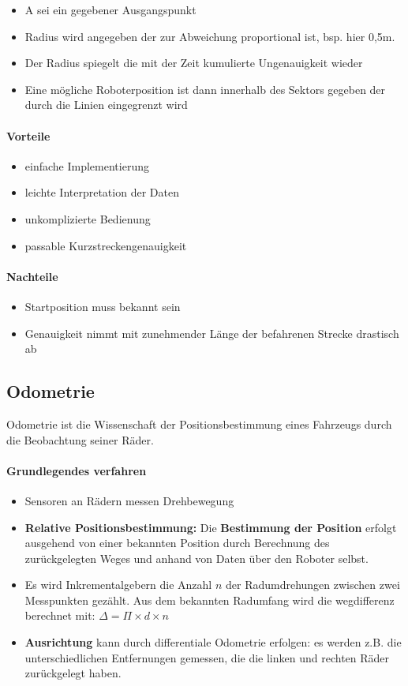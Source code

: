 \begin{itemize}
	\item A sei ein gegebener Ausgangspunkt
	\item Radius wird angegeben der zur Abweichung proportional ist, bsp. hier 0,5m.
	\item Der Radius spiegelt die mit der Zeit kumulierte Ungenauigkeit wieder
	\item Eine mögliche Roboterposition ist dann innerhalb des Sektors gegeben der durch die Linien eingegrenzt wird
\end{itemize}
\paragraph{Vorteile}
\begin{itemize}
	\item einfache Implementierung
	\item leichte Interpretation der Daten
	\item unkomplizierte Bedienung
	\item passable Kurzstreckengenauigkeit
\end{itemize}
\paragraph{Nachteile}
\begin{itemize}
	\item Startposition muss bekannt sein
	\item Genauigkeit nimmt mit zunehmender Länge der befahrenen Strecke drastisch ab
\end{itemize}
\subsection{Odometrie}
Odometrie ist die Wissenschaft der Positionsbestimmung eines Fahrzeugs durch die Beobachtung seiner Räder.
\paragraph{Grundlegendes verfahren}
\begin{itemize}
	\item Sensoren an Rädern messen Drehbewegung
	\item \textbf{Relative Positionsbestimmung:} Die \textbf{Bestimmung der Position} erfolgt ausgehend von einer bekannten Position durch Berechnung des zurückgelegten Weges und anhand von Daten über den Roboter selbst.
	\item Es wird Inkrementalgebern die Anzahl $n$ der Radumdrehungen zwischen zwei Messpunkten gezählt. Aus dem bekannten Radumfang wird die wegdifferenz berechnet mit:
	\subitem $\Delta = \Pi \times d \times n $
	\item \textbf{Ausrichtung} kann durch differentiale Odometrie erfolgen: es werden z.B. die unterschiedlichen Entfernungen gemessen, die die linken und rechten Räder zurückgelegt haben.
\end{itemize}

